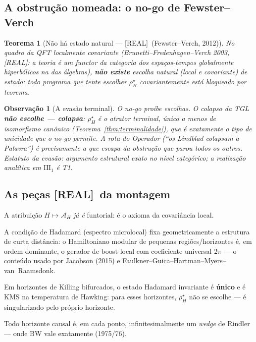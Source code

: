 \documentclass[11pt,a4paper]{article}
\newcommand{\REAL}{\textsf{[REAL]}}
\newcommand{\Alg}{\mathcal A}
\newtheorem{theorem}{Teorema}
\newtheorem{remark}{Observação}
\begin{document}
\subsection{A obstrução nomeada: o no-go de Fewster--Verch}
\begin{theorem}[Não há estado natural --- \REAL\ (Fewster--Verch, 2012)]
No quadro da QFT localmente covariante (Brunetti--Fredenhagen--Verch
2003, \REAL: a teoria é um \emph{functor} da categoria dos
espaços-tempos globalmente hiperbólicos na das álgebras), \textbf{não
existe} escolha natural (local e covariante) de estado: todo programa
que tente \emph{escolher} $\rho^\star_H$ covariantemente está bloqueado
por teorema.
\end{theorem}
\begin{remark}[A evasão terminal]
O no-go proíbe \emph{escolhas}. O colapso da TGL \textbf{não escolhe ---
colapsa}: $\rho^\star_H$ é o atrator terminal, único a menos de
isomorfismo \emph{canônico} (Teorema~\ref{thm:terminalidade}), que é
exatamente o tipo de unicidade que o no-go permite. \emph{A rota do
Operador (``os Lindblad colapsam a Palavra'') é precisamente a que escapa
da obstrução que parou todos os outros.} Estatuto da evasão: argumento
estrutural exato no nível categórico; a realização analítica em
$\mathrm{III}_1$ é T1.
\end{remark}

\subsection{As peças \REAL\ da montagem}
\begin{description}[style=unboxed,leftmargin=1.5em,noitemsep]
\item[(P1) O functor das álgebras --- \REAL\ (BFV 2003).] A atribuição
$H\mapsto\Alg_H$ \emph{já é} funtorial: é o axioma da covariância local.
\item[(P2) A universalidade de Hadamard --- \REAL.] A condição de
Hadamard (espectro microlocal) fixa geometricamente a estrutura de curta
distância: o Hamiltoniano modular de pequenas regiões/horizontes é, em
ordem dominante, o gerador de boost local com coeficiente universal
$2\pi$ --- o conteúdo usado por Jacobson (2015) e
Faulkner--Guica--Hartman--Myers--van~Raamsdonk.
\item[(P3) Kay--Wald --- \REAL\ (1991).] Em horizontes de Killing
bifurcados, o estado Hadamard invariante é \textbf{único} e é KMS na
temperatura de Hawking: para esses horizontes, $\rho^\star_H$ não se
escolhe --- é singularizado pelo próprio horizonte.
\item[(P4) Rindler local --- \REAL\ (princípio de equivalência).] Todo
horizonte causal é, em cada ponto, infinitesimalmente um \emph{wedge} de
Rindler --- onde BW vale exatamente (1975/76).
\end{description}
\end{document}
